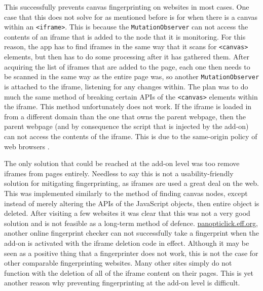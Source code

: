 This successfully prevents canvas fingerprinting on websites in most cases.
One case that this does not solve for as mentioned before is for when there is a canvas within an \texttt{<iframe>}.
This is because the \texttt{MutationObserver} can not access the contents of an iframe that is added to the node that it is monitoring.
For this reason, the app has to find iframes in the same way that it scans for \texttt{<canvas>} elements, but then has to do some processing after it has gathered them.
After acquiring the list of iframes that are added to the page, each one then needs to be scanned in the same way as the entire page was, so another \texttt{MutationObserver} is attached to the iframe, listening for any changes within.
The plan was to do much the same method of breaking certain APIs of the \texttt{<canvas>} elements within the iframe.
This method unfortunately does not work.
If the iframe is loaded in from a different domain than the one that owns the parent webpage, then the parent webpage (and by consequence the script that is injected by the add-on) can not access the contents of the iframe.
This is due to the same-origin policy of web browsers \citep{same-origin}.

The only solution that could be reached at the add-on level was too remove iframes from pages entirely.
Needless to say this is not a usability-friendly solution for mitigating fingerprinting, as iframes are used a great deal on the web.
This was implemented similarly to the method of finding canvas nodes, except instead of merely altering the APIs of the JavaScript objects, then entire object is deleted.
After visiting a few websites it was clear that this was not a very good solution and is not feasible as a long-term method of defence.
\url{panopticlick.eff.org}, another online fingerprint checker can not successfully take a fingerprint when the add-on is activated with the iframe deletion code in effect.
Although it may be seen as a positive thing that a fingerprinter does not work, this is not the case for other comparable fingerprinting websites.
Many other sites simply do not function with the deletion of all of the iframe content on their pages.
This is yet another reason why preventing fingerprinting at the add-on level is difficult.

